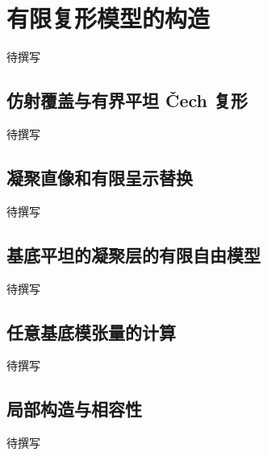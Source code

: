 
% 
% 

\section{有限复形模型的构造}
\label{g5:sec:2002}

待撰写

\subsection{仿射覆盖与有界平坦 Čech 复形}
\label{g5:subsec:2002:01}
待撰写

\subsection{凝聚直像和有限呈示替换}
\label{g5:subsec:2002:02}
待撰写

\subsection{基底平坦的凝聚层的有限自由模型}
\label{g5:subsec:2002:03}
待撰写

\subsection{任意基底模张量的计算}
\label{g5:subsec:2002:04}
待撰写

\subsection{局部构造与相容性}
\label{g5:subsec:2002:05}
待撰写
